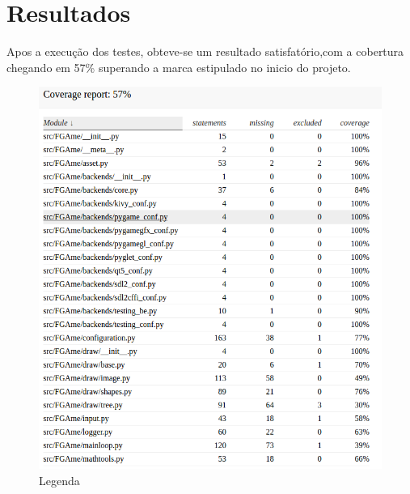 \chapter{Resultados}

Apos a execução dos testes, obteve-se um resultado satisfatório,com a cobertura chegando em 57\% superando a marca estipulado no inicio do projeto.

\begin{figure}[!htb]
\centering
\includegraphics[scale=0.6]{figuras/coverage}
\caption{Legenda}
\label{Rotulo}
\end{figure}
